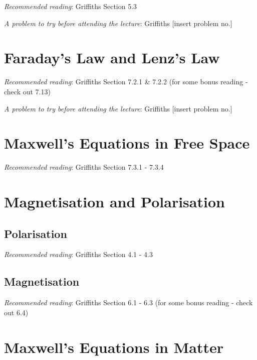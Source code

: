 \documentclass[
  letterpaper,
  DIV=11,
  numbers=noendperiod]{scrreprt}
\begin{document}
\emph{Recommended reading}: Griffiths Section 5.3

\emph{A problem to try before attending the lecture}: Griffiths
{[}insert problem no.{]}


\chapter{Faraday's Law and Lenz's Law}\label{faradays-law-and-lenzs-law}

\emph{Recommended reading}: Griffiths Section 7.2.1 \& 7.2.2 (for some
bonus reading - check out 7.13)

\emph{A problem to try before attending the lecture}: Griffiths
{[}insert problem no.{]}


\chapter{Maxwell's Equations in Free
Space}\label{maxwells-equations-in-free-space}

\emph{Recommended reading}: Griffiths Section 7.3.1 - 7.3.4


\chapter{Magnetisation and
Polarisation}\label{magnetisation-and-polarisation}

\section{Polarisation}\label{polarisation}

\emph{Recommended reading}: Griffiths Section 4.1 - 4.3

\section{Magnetisation}\label{magnetisation}

\emph{Recommended reading}: Griffiths Section 6.1 - 6.3 (for some bonus
reading - check out 6.4)


\chapter{Maxwell's Equations in
Matter}\label{maxwells-equations-in-matter}
\end{document}
